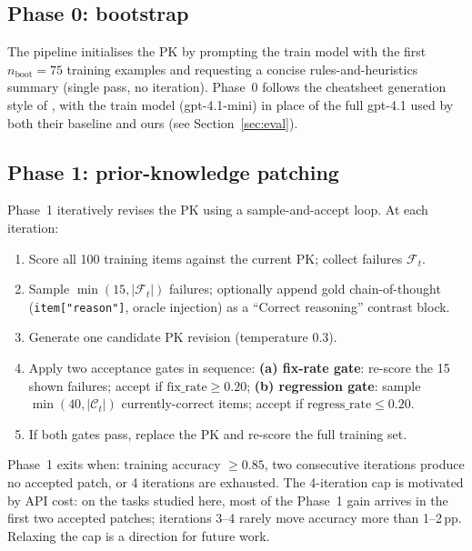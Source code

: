 \documentclass{article}
\begin{document}
\subsection{Phase 0: bootstrap}
\label{sec:phase0}

The pipeline initialises the PK by prompting the train model with the first
$n_\text{boot}=75$ training examples and requesting a concise rules-and-heuristics summary
(single pass, no iteration).
Phase~0 follows the cheatsheet generation style of \citet{csicl2024}, with the
train model (gpt-4.1-mini) in place of the full gpt-4.1 used by both their baseline
and ours (see Section~\ref{sec:eval}).

\subsection{Phase 1: prior-knowledge patching}
\label{sec:phase1}

Phase~1 iteratively revises the PK using a sample-and-accept loop.
At each iteration:

\begin{enumerate}[noitemsep,topsep=2pt]
  \item Score all 100 training items against the current PK; collect failures $\mathcal{F}_t$.
  \item Sample $\min(15,|\mathcal{F}_t|)$ failures; optionally append gold chain-of-thought
        (\texttt{item["reason"]}, oracle injection) as a ``Correct reasoning'' contrast block.
  \item Generate one candidate PK revision (temperature 0.3).
  \item Apply two acceptance gates in sequence:
        \textbf{(a) fix-rate gate}: re-score the 15 shown failures; accept if
        $\text{fix\_rate} \geq 0.20$;
        \textbf{(b) regression gate}: sample $\min(40, |\mathcal{C}_t|)$ currently-correct
        items; accept if $\text{regress\_rate} \leq 0.20$.
  \item If both gates pass, replace the PK and re-score the full training set.
\end{enumerate}

Phase~1 exits when: training accuracy $\geq 0.85$, two consecutive iterations produce no
accepted patch, or 4 iterations are exhausted.
The 4-iteration cap is motivated by API cost: on the tasks studied here, most of the
Phase~1 gain arrives in the first two accepted patches; iterations 3--4 rarely move
accuracy more than 1--2\,pp.
Relaxing the cap is a direction for future work.
\end{document}
